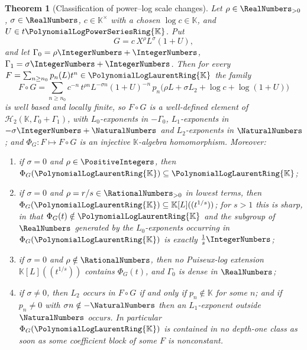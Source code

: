 \documentclass[11pt,oneside]{article}
\theoremstyle{plain}
\newtheorem{theorem}{Theorem}[section]
\theoremstyle{definition}
\theoremstyle{remark}
\newcommand{\K}{\mathbb{K}}
\newcommand{\PLpow}{\PolynomialLogPowerSeriesRing{\K}}   %
\newcommand{\PLlau}{\PolynomialLogLaurentRing{\K}}       %
\newcommand{\compose}{\mathbin{\circ}}
\begin{document}
\begin{theorem}[Classification of power--log scale changes]
\label{plt:thm:grp-scale-classification}
Let \(\rho\in\RealNumbers_{>0}\), \(\sigma\in\RealNumbers\),
\(c\in\K^{\times}\) with a chosen \(\log c\in\K\), and \(U\in t\PLpow\).  Put
\[
  G=c\,X^{\rho}L^{\sigma}(1+U),
\]
and let \(\Gamma_0=\rho\IntegerNumbers+\IntegerNumbers\),
\(\Gamma_1=\sigma\IntegerNumbers+\IntegerNumbers\).  Then for every
\(F=\sum_{n\ge n_0}p_n(L)t^n\in\PLlau\) the family
\begin{equation}\label{plt:eq:grp-scale-formula}
  F\compose G
  =\sum_{n\ge n_0}
   c^{-n}\,t^{\rho n}L^{-\sigma n}(1+U)^{-n}\,
   p_n\bigl(\rho L+\sigma L_2+\log c+\log(1+U)\bigr)
\end{equation}
is well based and locally finite, so \(F\compose G\) is a well-defined element
of \(\mathcal H_2(\K,\Gamma_0+\Gamma_1)\), with \(L_0\)-exponents in
\(-\Gamma_0\), \(L_1\)-exponents in \(-\sigma\IntegerNumbers+\NaturalNumbers\)
and \(L_2\)-exponents in \(\NaturalNumbers\); and
\(\Phi_G:F\mapsto F\compose G\) is an injective \(\K\)-algebra homomorphism.
Moreover:
\begin{enumerate}
\item if \(\sigma=0\) and \(\rho\in\PositiveIntegers\), then
\(\Phi_G(\PLlau)\subseteq\PLlau\);
\item if \(\sigma=0\) and \(\rho=r/s\in\RationalNumbers_{>0}\) in lowest terms,
then \(\Phi_G(\PLlau)\subseteq\K[L]((t^{1/s}))\); for \(s>1\) this is sharp, in
that \(\Phi_G(t)\notin\PLlau\) and the subgroup of \(\RealNumbers\) generated
by the \(L_0\)-exponents occurring in \(\Phi_G(\PLlau)\) is exactly
\(\frac1s\IntegerNumbers\);
\item if \(\sigma=0\) and \(\rho\notin\RationalNumbers\), then no Puiseux-log
extension \(\K[L]((t^{1/s}))\) contains \(\Phi_G(t)\), and
\(\Gamma_0\) is dense in \(\RealNumbers\);
\item if \(\sigma\ne0\), then \(L_2\) occurs in \(F\compose G\) if and only if
\(p_n\notin\K\) for some \(n\); and if \(p_n\ne0\) with
\(\sigma n\notin-\NaturalNumbers\) then an \(L_1\)-exponent outside
\(\NaturalNumbers\) occurs.  In particular \(\Phi_G(\PLlau)\) is contained in
no depth-one class as soon as some coefficient block of some \(F\) is
nonconstant.
\end{enumerate}
\end{theorem}
\end{document}
